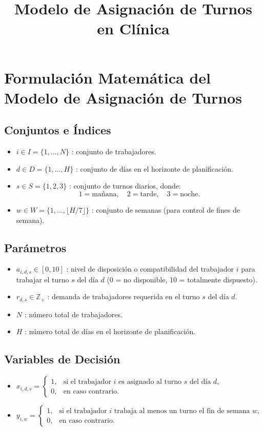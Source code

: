 \documentclass[a4paper,12pt]{article}
\title{Modelo de Asignación de Turnos en Clínica}
\author{}
\date{}
\begin{document}
	\maketitle
	
	\section*{Formulación Matemática del Modelo de Asignación de Turnos}
	
	\subsection*{Conjuntos e Índices}
	\begin{itemize}
		\item $i \in I = \{1, \dots, N\}$ : conjunto de trabajadores.
		\item $d \in D = \{1, \dots, H\}$ : conjunto de días en el horizonte de planificación.
		\item $s \in S = \{1, 2, 3\}$ : conjunto de turnos diarios, donde:
		\[
		1 = \text{mañana}, \quad 2 = \text{tarde}, \quad 3 = \text{noche}.
		\]
		\item $w \in W = \{1, \dots, \lfloor H/7 \rfloor\}$ : conjunto de semanas (para control de fines de semana).
	\end{itemize}
	
	\subsection*{Parámetros}
	\begin{itemize}
		\item $a_{i,d,s} \in [0,10]$ : nivel de disposición o compatibilidad del trabajador $i$ para trabajar el turno $s$ del día $d$ (0 = no disponible, 10 = totalmente dispuesto).
		\item $r_{d,s} \in \mathbb{Z}_{+}$ : demanda de trabajadores requerida en el turno $s$ del día $d$.
		\item $N$ : número total de trabajadores.
		\item $H$ : número total de días en el horizonte de planificación.
	\end{itemize}
	
	\subsection*{Variables de Decisión}
	\begin{itemize}
		\item $x_{i,d,s} =
		\begin{cases}
			1, & \text{si el trabajador $i$ es asignado al turno $s$ del día $d$,}\\
			0, & \text{en caso contrario.}
		\end{cases}$
		\item $y_{i,w} =
		\begin{cases}
			1, & \text{si el trabajador $i$ trabaja al menos un turno el fin de semana $w$,}\\
			0, & \text{en caso contrario.}
		\end{cases}$
	\end{itemize}
	
\end{document}
